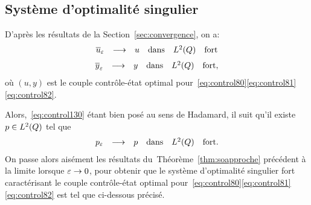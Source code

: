 \subsection{Système d'optimalité singulier}\label{sec:singularso}

D'après les résultats de la Section~\ref{sec:convergence}, on a:
\begin{equation*}
    \begin{array}{rcllll}
        {\overline{u}}_{\varepsilon} & \longrightarrow & u & \text{dans} & L^{2}\!\left({Q}\right) &
        \text{fort}
    \end{array}
\end{equation*}
\begin{equation*}
    \begin{array}{rcllll}
        {\overline{y}}_{\varepsilon} & \longrightarrow & y & \text{dans} & L^{2}\!\left({Q}\right) &
        \text{fort},
    \end{array}
\end{equation*}
où $(u,y)$ est le couple contrôle-état optimal
pour~\eqref{eq:control80}\eqref{eq:control81}\eqref{eq:control82}.

Alors,~\eqref{eq:control130} étant bien posé au sens de Hadamard, il suit
qu'il existe $p\in L^{2}\!\left({Q}\right)$ tel que
\begin{equation*}
    \begin{array}{rcllll}
        p_{\varepsilon} & \longrightarrow & p & \text{dans} & L^{2}\!\left({Q}\right) &
        \text{fort}.
    \end{array}
\end{equation*}
On passe alors aisément les résultats du~Théorème~\ref{thm:soapproche}
précédent à la limite lorsque $\varepsilon\to 0$, pour obtenir que le système
d'optimalité singulier fort caractérisant le couple contrôle-état optimal
pour~\eqref{eq:control80}\eqref{eq:control81}\eqref{eq:control82} est tel
que ci-dessous précisé.

